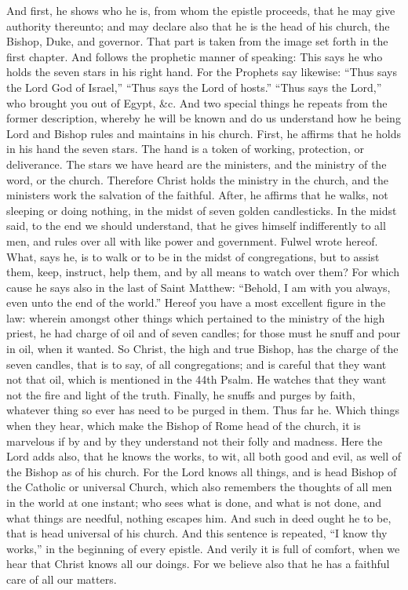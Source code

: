 And first, he shows who he is, from whom the epistle proceeds, that he may give authority thereunto; and may declare also that he is the head of his church, the Bishop, Duke, and governor. That part is taken from the image set forth in the first chapter. And follows the prophetic manner of speaking: This says he who holds the seven stars in his right hand. For the Prophets say likewise: “Thus says the Lord God of Israel,” “Thus says the Lord of hosts.” “Thus says the Lord,” who brought you out of Egypt, \&c. And two special things he repeats from the former description, whereby he will be known and do us understand how he being Lord and Bishop rules and maintains in his church. First, he affirms that he holds in his hand the seven stars. The hand is a token of working, protection, or deliverance. The stars we have heard are the ministers, and the ministry of the word, or the church. Therefore Christ holds the ministry in the church, and the ministers work the salvation of the faithful. After, he affirms that he walks, not sleeping or doing nothing, in the midst of seven golden candlesticks. In the midst said, to the end we should understand, that he gives himself indifferently to all men, and rules over all with like power and government. Fulwel wrote hereof. What, says he, is to walk or to be in the midst of congregations, but to assist them, keep, instruct, help them, and by all means to watch over them? For which cause he says also in the last of Saint Matthew: “Behold, I am with you always, even unto the end of the world.” Hereof you have a most excellent figure in the law: wherein amongst other things which pertained to the ministry of the high priest, he had charge of oil and of seven candles; for those must he snuff and pour in oil, when it wanted. So Christ, the high and true Bishop, has the charge of the seven candles, that is to say, of all congregations; and is careful that they want not that oil, which is mentioned in the 44th Psalm. He watches that they want not the fire and light of the truth. Finally, he snuffs and purges by faith, whatever thing so ever has need to be purged in them. Thus far he. Which things when they hear, which make the Bishop of Rome head of the church, it is marvelous if by and by they understand not their folly and madness. Here the Lord adds also, that he knows the works, to wit, all both good and evil, as well of the Bishop as of his church. For the Lord knows all things, and is head Bishop of the Catholic or universal Church, which also remembers the thoughts of all men in the world at one instant; who sees what is done, and what is not done, and what things are needful, nothing escapes him. And such in deed ought he to be, that is head universal of his church. And this sentence is repeated, “I know thy works,” in the beginning of every epistle. And verily it is full of comfort, when we hear that Christ knows all our doings. For we believe also that he has a faithful care of all our matters.

